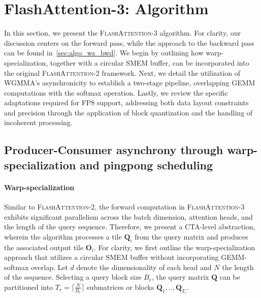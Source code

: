 \section{FlashAttention-3: Algorithm}
\label{sec:algo}

In this section, we present the \textsc{FlashAttention-3} algorithm. For clarity, our discussion centers on the forward pass, while the approach to the backward pass can be found in~\cref{sec:algo_ws_bwd}. We begin by outlining how warp-specialization, together with a circular SMEM buffer, can be incorporated into the original \textsc{FlashAttention-2} framework. Next, we detail the utilization of WGMMA’s asynchronicity to establish a two-stage pipeline, overlapping GEMM computations with the softmax operation. Lastly, we review the specific adaptations required for FP8 support, addressing both data layout constraints and precision through the application of block quantization and the handling of incoherent processing.

\subsection{Producer-Consumer asynchrony through warp-specialization and pingpong scheduling}
\label{sec:algo_ws}

\paragraph{Warp-specialization}
Similar to \textsc{FlashAttention-2}, the forward computation in \textsc{FlashAttention-3} exhibits significant parallelism across the batch dimension, attention heads, and the length of the query sequence. Therefore, we present a CTA-level abstraction, wherein the algorithm processes a tile $\mathbf{Q}_i$ from the query matrix and produces the associated output tile $\mathbf{O}_i$. For clarity, we first outline the warp-specialization approach that utilizes a circular SMEM buffer without incorporating GEMM-softmax overlap. Let $d$ denote the dimensionality of each head and $N$ the length of the sequence. Selecting a query block size $B_r$, the query matrix $\mathbf{Q}$ can be partitioned into $T_r = \lceil \frac{N}{B_r} \rceil$ submatrices or blocks $\mathbf{Q}_1, .., \mathbf{Q}_{T_r}$.

